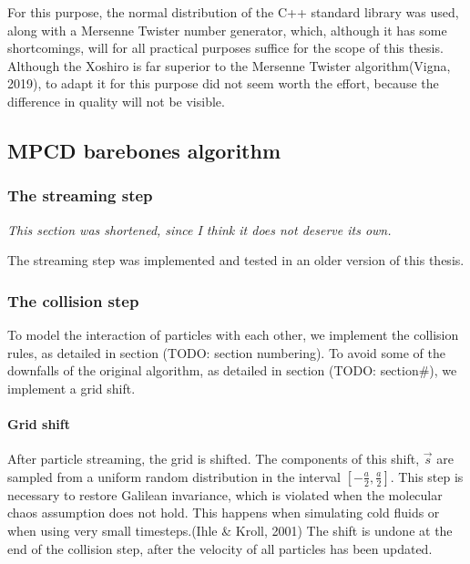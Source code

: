 \documentclass[
]{article}
\begin{document}
For this purpose, the normal distribution of the C++ standard library
was used, along with a Mersenne Twister number generator, which,
although it has some shortcomings, will for all practical purposes
suffice for the scope of this thesis. Although the Xoshiro is far
superior to the Mersenne Twister algorithm(Vigna, 2019), to adapt it for
this purpose did not seem worth the effort, because the difference in
quality will not be visible.

\hypertarget{mpcd-barebones-algorithm}{%
\subsection{MPCD barebones algorithm}\label{mpcd-barebones-algorithm}}

\hypertarget{the-streaming-step-1}{%
\subsubsection{The streaming step}\label{the-streaming-step-1}}

\emph{This section was shortened, since I think it does not deserve its
own.}

The streaming step was implemented and tested in an older version of
this thesis.

\hypertarget{the-collision-step-1}{%
\subsubsection{The collision step}\label{the-collision-step-1}}

To model the interaction of particles with each other, we implement the
collision rules, as detailed in section (TODO: section numbering). To
avoid some of the downfalls of the original algorithm, as detailed in
section (TODO: section\#), we implement a grid shift.

\hypertarget{grid-shift}{%
\paragraph{Grid shift}\label{grid-shift}}

After particle streaming, the grid is shifted. The components of this
shift, \(\vec{s}\) are sampled from a uniform random distribution in the
interval \([-\frac{a}{2},\frac{a}{2}]\). This step is necessary to
restore Galilean invariance, which is violated when the molecular chaos
assumption does not hold. This happens when simulating cold fluids or
when using very small timesteps.(Ihle \& Kroll, 2001) The shift is
undone at the end of the collision step, after the velocity of all
particles has been updated.
\end{document}
